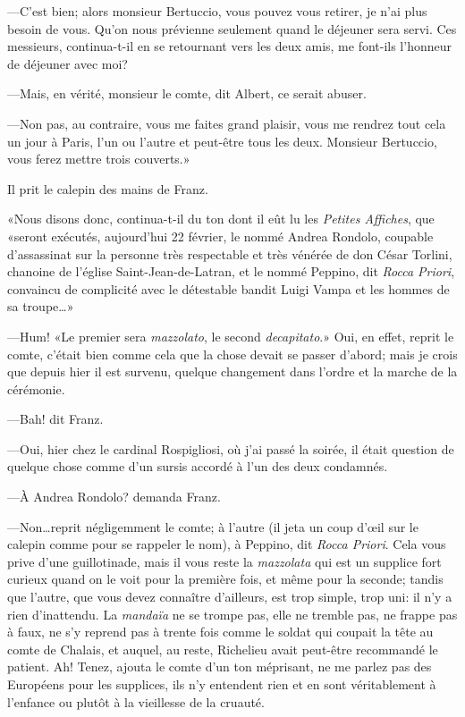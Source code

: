 —C'est bien; alors monsieur Bertuccio, vous pouvez vous retirer, je n'ai plus besoin de vous. Qu'on nous prévienne seulement quand le déjeuner sera servi. Ces messieurs, continua-t-il en se retournant vers les deux amis, me font-ils l'honneur de déjeuner avec moi? 

—Mais, en vérité, monsieur le comte, dit Albert, ce serait abuser. 

—Non pas, au contraire, vous me faites grand plaisir, vous me rendrez tout cela un jour à Paris, l'un ou l'autre et peut-être tous les deux. Monsieur Bertuccio, vous ferez mettre trois couverts.» 

Il prit le calepin des mains de Franz. 

«Nous disons donc, continua-t-il du ton dont il eût lu les \textit{Petites Affiches}, que «seront exécutés, aujourd'hui 22 février, le nommé Andrea Rondolo, coupable d'assassinat sur la personne très respectable et très vénérée de don César Torlini, chanoine de l'église Saint-Jean-de-Latran, et le nommé Peppino, dit \textit{Rocca Priori}, convaincu de complicité avec le détestable bandit Luigi Vampa et les hommes de sa troupe\dots» 

—Hum! «Le premier sera \textit{mazzolato}, le second \textit{decapitato}.» Oui, en effet, reprit le comte, c'était bien comme cela que la chose devait se passer d'abord; mais je crois que depuis hier il est survenu, quelque changement dans l'ordre et la marche de la cérémonie. 

—Bah! dit Franz. 

—Oui, hier chez le cardinal Rospigliosi, où j'ai passé la soirée, il était question de quelque chose comme d'un sursis accordé à l'un des deux condamnés. 

—À Andrea Rondolo? demanda Franz. 

—Non\dots reprit négligemment le comte; à l'autre (il jeta un coup d'œil sur le calepin comme pour se rappeler le nom), à Peppino, dit \textit{Rocca Priori}. Cela vous prive d'une guillotinade, mais il vous reste la \textit{mazzolata} qui est un supplice fort curieux quand on le voit pour la première fois, et même pour la seconde; tandis que l'autre, que vous devez connaître d'ailleurs, est trop simple, trop uni: il n'y a rien d'inattendu. La \textit{mandaïa} ne se trompe pas, elle ne tremble pas, ne frappe pas à faux, ne s'y reprend pas à trente fois comme le soldat qui coupait la tête au comte de Chalais, et auquel, au reste, Richelieu avait peut-être recommandé le patient. Ah! Tenez, ajouta le comte d'un ton méprisant, ne me parlez pas des Européens pour les supplices, ils n'y entendent rien et en sont véritablement à l'enfance ou plutôt à la vieillesse de la cruauté. 


